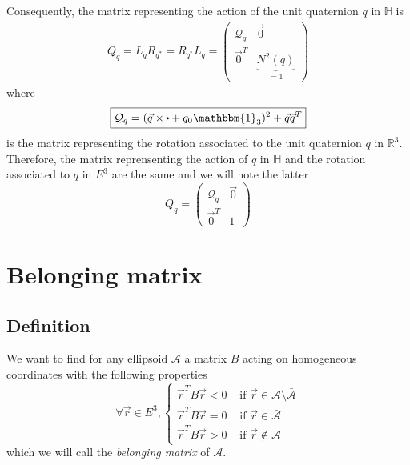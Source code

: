 \documentclass[class=report, float=false, crop=false]{standalone}
\begin{document}
Consequently, the matrix representing the action of the unit quaternion $q$ in $\mathbb{H}$ is 
\begin{align*}
Q_q = L_qR_{q^*} = R_{q^*}L_q = \begin{pmatrix} \mathcal{Q}_q & \vec{0} \\ \vec{0}^T & \underbrace{N^2(q)}_{=1} \end{pmatrix}
\end{align*}
where
\begin{equation}
\boxed{\mathcal{Q}_q = (\vec{q}\times\bigcdot + q_0\mathbbm{1}_3)^2 + \vec{q}\vec{q}^T}
\label{rotation_matrix_R3}
\end{equation}
is the matrix representing the rotation associated to the unit quaternion $q$ in $\mathbb{R}^3$.\\

Therefore, the matrix reprensenting the action of $q$ in $\mathbb{H}$ and the rotation associated to $q$ in $E^3$ are the same and we will note the latter
\begin{equation}
\boxed{Q_q = \begin{pmatrix} \mathcal{Q}_q & \vec{0} \\ \vec{0}^T & 1 \end{pmatrix}}
\label{rotation_matrix}
\end{equation}

\section{Belonging matrix}

\subsection{Definition}

We want to find for any ellipsoid $\mathcal{A}$ a matrix $B$ acting on homogeneous coordinates with the following properties
\begin{equation}
\forall \vec{r} \in E^3, \begin{cases} \vec{r}^T B \vec{r} < 0 &\text{ if } \vec{r} \in \mathcal{A} \setminus \bar{\mathcal{A}} \\ \vec{r}^T B \vec{r} = 0 &\text{ if } \vec{r} \in \bar{\mathcal{A}} \\ \vec{r}^T B \vec{r} > 0 &\text{ if } \vec{r} \notin \mathcal{A} \end{cases}
\label{belonging_definition}
\end{equation}
which we will call the \textit{belonging matrix} of $\mathcal{A}$.
\end{document}
